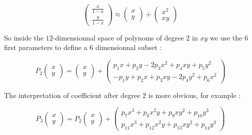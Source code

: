 \begin{equation}
   \begin{pmatrix}  \frac{x}{1-x} \\  \frac{y}{1-x}  \end{pmatrix} 
  \approx \begin{pmatrix}   x  \\  y  \end{pmatrix}  
          + \begin{pmatrix}   x^2  \\  xy  \end{pmatrix} 
   \label{Rot:Deg2}
\end{equation}

So inside   the $12$-dimensionnal space of polynoms of degree $2$ in $xy$ we
use the  $6$ first parameters to define a  $6$ dimensionnal subset :


\begin{equation}
   P_2 \begin{pmatrix}  x \\  y  \end{pmatrix} 
   = \begin{pmatrix}  x \\  y  \end{pmatrix}
     + \begin{pmatrix}  p_1 x  + p_2 y -2 p_3 x^2  + p_4 xy + p_5 y^2 
                     \\ -p_1y + p_2 x  + p_3 xy - 2 p_4 y^2 + p_6 x^2 \end{pmatrix}
\end{equation}


The interpretation of coefficient after degree $2$ is more obvious, for example :

\begin{equation}
   P_3 \begin{pmatrix}  x \\  y  \end{pmatrix} 
   = P_2 \begin{pmatrix}  x \\  y  \end{pmatrix} 
     +    \begin{pmatrix}  p_7 x^3 + p_8 x^2y + p_9 xy^2 + p_{10} y^3  
                        \\  p_{11} x^3 + p_{12} x^2y + p_{13} xy^2 + p_{14} y^3   \end{pmatrix} 
\end{equation}



